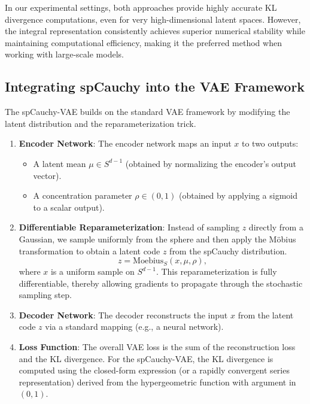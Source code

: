 \documentclass{article}
\begin{document}
In our experimental settings, both approaches provide highly accurate KL divergence computations, even for very high-dimensional latent spaces. However, the integral representation consistently achieves superior numerical stability while maintaining computational efficiency, making it the preferred method when working with large-scale models.


\subsection{Integrating spCauchy into the VAE Framework} \label{method}


The spCauchy-VAE builds on the standard VAE framework by modifying the latent distribution and the reparameterization trick.

\begin{enumerate}
    \item \textbf{Encoder Network}:  
    The encoder network maps an input \(x\) to two outputs:
    \begin{itemize}
        \item A latent mean \(\mu \in S^{d-1}\) (obtained by normalizing the encoder’s output vector).
        \item A concentration parameter \(\rho \in (0,1)\) (obtained by applying a sigmoid to a scalar output).
    \end{itemize}

    \item \textbf{Differentiable Reparameterization}:  
    Instead of sampling \(z\) directly from a Gaussian, we sample uniformly from the sphere and then apply the Möbius transformation to obtain a latent code \(z\) from the spCauchy distribution.
    \[
    z = \mathrm{Moebius}_S(x, \mu, \rho),
    \]
    where \(x\) is a uniform sample on \(S^{d-1}\). This reparameterization is fully differentiable, thereby allowing gradients to propagate through the stochastic sampling step.

    \item \textbf{Decoder Network}:  
    The decoder reconstructs the input \(x\) from the latent code \(z\) via a standard mapping (e.g., a neural network).

    \item \textbf{Loss Function}:  
    The overall VAE loss is the sum of the reconstruction loss and the KL divergence. For the spCauchy-VAE, the KL divergence is computed using the closed-form expression (or a rapidly convergent series representation) derived from the hypergeometric function with argument in \((0,1)\).
\end{enumerate}
\end{document}
